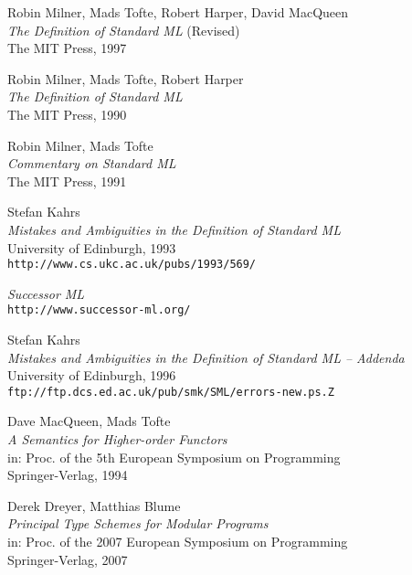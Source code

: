 \documentclass[twoside,titlepage]{article}
\newcommand{\void}[1]{}
\begin{document}
\begin{appendix}
\begin{thebibliography}{MTHM97}
Robin Milner, Mads Tofte, Robert Harper, David MacQueen \\
{\it The Definition of Standard ML} (Revised) \\
The MIT Press, 1997

Robin Milner, Mads Tofte, Robert Harper \\
{\it The Definition of Standard ML} \\
The MIT Press, 1990

Robin Milner, Mads Tofte \\
{\it Commentary on Standard ML} \\
The MIT Press, 1991

Stefan Kahrs \\
{\it Mistakes and Ambiguities in the Definition of Standard ML} \\
University of Edinburgh, 1993 \\
{\small\tt{http://www.cs.ukc.ac.uk/pubs/1993/569/}}

{\it Successor ML} \\
{\small\tt{http://www.successor-ml.org/}}

Stefan Kahrs \\
{\it Mistakes and Ambiguities in the Definition of Standard ML -- Addenda} \\
University of Edinburgh, 1996 \\
{\small\tt{ftp://ftp.dcs.ed.ac.uk/pub/smk/SML/errors-new.ps.Z}}

Dave MacQueen, Mads Tofte \\
{\it A Semantics for Higher-order Functors} \\
in: Proc. of the 5th European Symposium on Programming \\
Springer-Verlag, 1994

Derek Dreyer, Matthias Blume \\
{\it Principal Type Schemes for Modular Programs} \\
in: Proc. of the 2007 European Symposium on Programming \\
Springer-Verlag, 2007

\void{
\bibitem[DHCK06]{typeclasses}
Derek Dreyer, Robert Harper, Manuel Chakravarty, Gabriele Keller \\
{\it Modular Type Classes} \\
Draft, 2006 \\
{\small\tt{http://www.cs.cmu.edu/~rwh/papers/mtc/apr06.pdf}}
}


\end{thebibliography}
\end{appendix}
\end{document}
